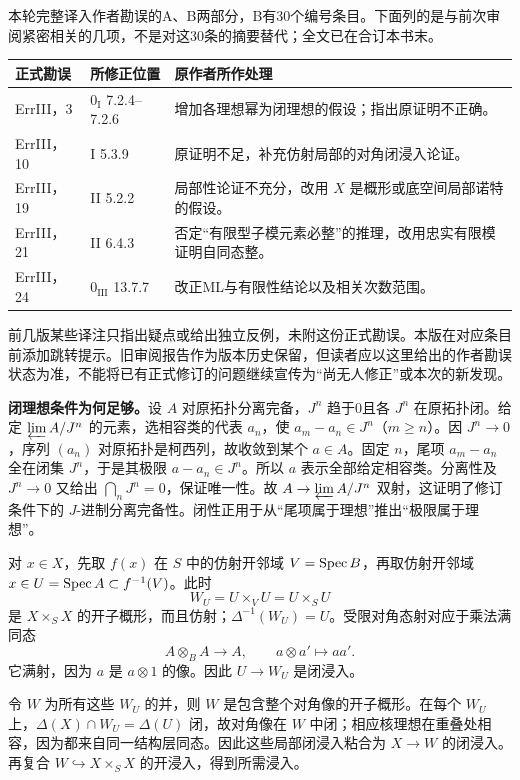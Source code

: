 本轮完整译入作者勘误的A、B两部分，B有30个编号条目。下面列的是与前次审阅紧密相关的几项，不是对这30条的摘要替代；全文已在合订本书末。

\begin{longtable}{@{}p{.19\linewidth}p{.24\linewidth}p{.49\linewidth}@{}}
\toprule 正式勘误 & 所修正位置 & 原作者所作处理\\\midrule\endhead
ErrIII，3 & $0_{\mathrm I}$ 7.2.4--7.2.6 & 增加各理想幂为闭理想的假设；指出原证明不正确。\\
ErrIII，10 & I 5.3.9 & 原证明不足，补充仿射局部的对角闭浸入论证。\\
ErrIII，19 & II 5.2.2 & 局部性论证不充分，改用 $X$ 是概形或底空间局部诺特的假设。\\
ErrIII，21 & II 6.4.3 & 否定“有限型子模元素必整”的推理，改用忠实有限模证明自同态整。\\
ErrIII，24 & $0_{\mathrm{III}}$ 13.7.7 & 改正ML与有限性结论以及相关次数范围。\\
\bottomrule
\end{longtable}
前几版某些译注只指出疑点或给出独立反例，未附这份正式勘误。本版在对应条目前添加跳转提示。旧审阅报告作为版本历史保留，但读者应以这里给出的作者勘误状态为准，不能将已有正式修订的问题继续宣传为“尚无人修正”或本次的新发现。

\textbf{闭理想条件为何足够。}设 $A$ 对原拓扑分离完备，$J^n$ 趋于0且各 $J^n$ 在原拓扑闭。给定 $\varprojlim A/J^n$ 的元素，选相容类的代表 $a_n$，使 $a_m-a_n\in J^n$（$m\geq n$）。因 $J^n\to0$，序列 $(a_n)$ 对原拓扑是柯西列，故收敛到某个 $a\in A$。固定 $n$，尾项 $a_m-a_n$ 全在闭集 $J^n$，于是其极限 $a-a_n\in J^n$。所以 $a$ 表示全部给定相容类。分离性及 $J^n\to0$ 又给出 $\bigcap_nJ^n=0$，保证唯一性。故 $A\to\varprojlim A/J^n$ 双射，这证明了修订条件下的 $J$-进制分离完备性。闭性正用于从“尾项属于理想”推出“极限属于理想”。

对 $x\in X$，先取 $f(x)$ 在 $S$ 中的仿射开邻域 $V=\operatorname{Spec} B$，再取仿射开邻域 $x\in U=\operatorname{Spec} A\subset f^{-1}(V)$。此时
\[
 W_U=U\times_VU=U\times_SU
\]
是 $X\times_SX$ 的开子概形，而且仿射；$\Delta^{-1}(W_U)=U$。受限对角态射对应于乘法满同态
\[
 A\otimes_BA\longrightarrow A,
 \qquad a\otimes a'\longmapsto aa'.
\]
它满射，因为 $a$ 是 $a\otimes1$ 的像。因此 $U\to W_U$ 是闭浸入。

令 $W$ 为所有这些 $W_U$ 的并，则 $W$ 是包含整个对角像的开子概形。在每个 $W_U$ 上，$\Delta(X)\cap W_U=\Delta(U)$ 闭，故对角像在 $W$ 中闭；相应核理想在重叠处相容，因为都来自同一结构层同态。因此这些局部闭浸入粘合为 $X\to W$ 的闭浸入。再复合 $W\hookrightarrow X\times_SX$ 的开浸入，得到所需浸入。


